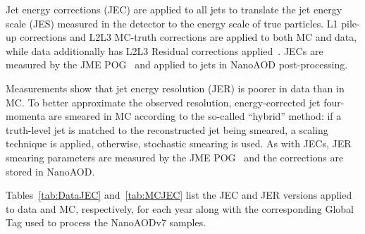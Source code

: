 Jet energy corrections (JEC) are applied to all jets to translate the jet energy scale (JES) measured in the detector to the energy scale of true particles. L1 pile-up corrections and L2L3 MC-truth corrections are applied to both MC and data, while data additionally has L2L3 Residual corrections applied~\cite{JetCorr}. JECs are measured by the JME POG~\cite{JECTwiki} and applied to jets in NanoAOD post-processing. 

Measurements show that jet energy resolution (JER) is poorer in data than in MC. To better approximate the observed resolution, energy-corrected jet four-momenta are smeared in MC according to the so-called ``hybrid'' method: if a truth-level jet is matched to the reconstructed jet being smeared, a scaling technique is applied, otherwise, stochastic smearing is used. As with JECs, JER smearing parameters are measured by the JME POG~\cite{JERTwiki} and the corrections are stored in NanoAOD.

Tables~\ref{tab:DataJEC} and~\ref{tab:MCJEC} list the JEC and JER versions applied to data and MC, respectively, for each year along with the corresponding Global Tag used to process the NanoAODv7 samples.

